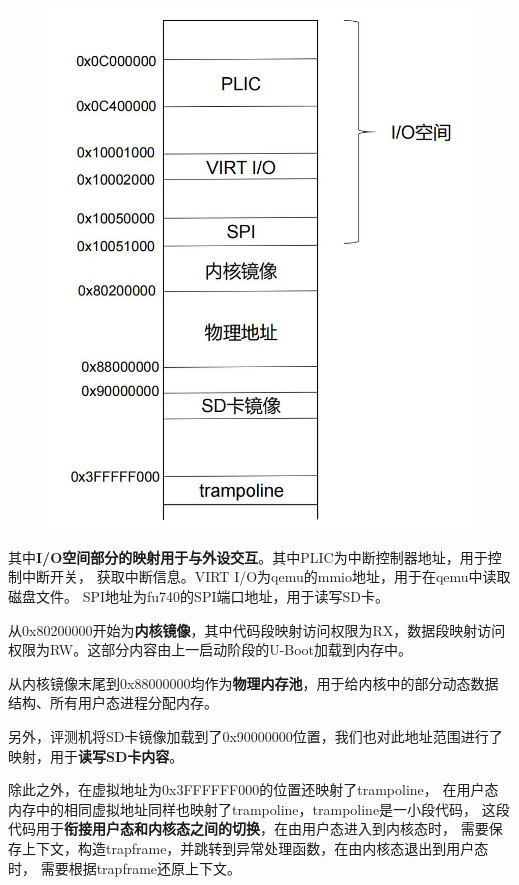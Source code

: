 \documentclass[UTF8,a4paper,10pt]{ctexart}
\begin{document}
\begin{figure}[H]
  \centering
  \includegraphics[scale=0.5]{image/mem01.jpg}
\end{figure}

其中\textbf{I/O空间部分的映射用于与外设交互}。其中PLIC为中断控制器地址，用于控制中断开关，
获取中断信息。VIRT I/O为qemu的mmio地址，用于在qemu中读取磁盘文件。
SPI地址为fu740的SPI端口地址，用于读写SD卡。

从0x80200000开始为\textbf{内核镜像}，其中代码段映射访问权限为RX，数据段映射访问权限为RW。这部分内容由上一启动阶段的U-Boot加载到内存中。

从内核镜像末尾到0x88000000均作为\textbf{物理内存池}，用于给内核中的部分动态数据结构、所有用户态进程分配内存。

另外，评测机将SD卡镜像加载到了0x90000000位置，我们也对此地址范围进行了映射，用于\textbf{读写SD卡内容}。

除此之外，在虚拟地址为0x3FFFFFF000的位置还映射了trampoline，
在用户态内存中的相同虚拟地址同样也映射了trampoline，trampoline是一小段代码，
这段代码用于\textbf{衔接用户态和内核态之间的切换}，在由用户态进入到内核态时，
需要保存上下文，构造trapframe，并跳转到异常处理函数，在由内核态退出到用户态时，
需要根据trapframe还原上下文。
\end{document}
